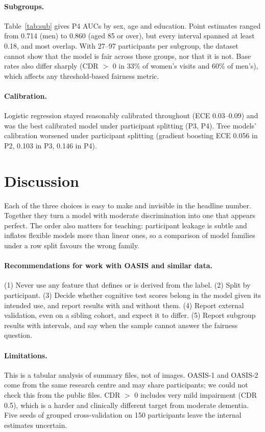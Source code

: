 \documentclass[11pt]{article}
\begin{document}


\paragraph{Subgroups.} Table~\ref{tab:sub} gives P4 AUCs by sex, age and education. Point estimates ranged from 0.714 (men) to 0.860
(aged 85 or over), but every interval spanned at least 0.18, and most overlap. With 27--97 participants per subgroup, the dataset
cannot show that the model is fair across these groups, nor that it is not. Base rates also differ sharply (CDR \(>\) 0 in 33\% of
women's visits and 60\% of men's), which affects any threshold-based fairness metric.

\paragraph{Calibration.} Logistic regression stayed reasonably calibrated throughout (ECE 0.03--0.09) and was the best calibrated
model under participant splitting (P3, P4). Tree models' calibration
worsened under participant splitting (gradient boosting ECE 0.056 in P2, 0.103 in P3, 0.146 in P4).

\section{Discussion}
Each of the three choices is easy to make and invisible in the headline number. Together they turn a model with moderate
discrimination into one that appears perfect. The order also matters for teaching: participant leakage is subtle and inflates flexible
models more than linear ones, so a comparison of model families under a row split favours the wrong family.

\paragraph{Recommendations for work with OASIS and similar data.} (1) Never use any feature that defines or is derived from the label.
(2) Split by participant. (3) Decide whether cognitive test scores belong in the model given its intended use, and report results with
and without them. (4) Report external validation, even on a sibling cohort, and expect it to differ. (5) Report subgroup results with
intervals, and say when the sample cannot answer the fairness question.

\paragraph{Limitations.} This is a tabular analysis of summary files, not of images. OASIS-1 and OASIS-2 come from the same research
centre and may share participants; we could not check this from the public files. CDR \(>\) 0 includes very mild impairment (CDR 0.5),
which is a harder and clinically different target from moderate dementia. Five seeds of grouped cross-validation on 150 participants leave
the internal estimates uncertain.
\end{document}
